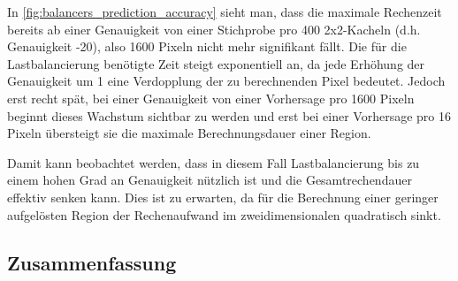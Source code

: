 In \autoref{fig:balancers_prediction_accuracy} sieht man, dass die maximale Rechenzeit bereits ab einer Genauigkeit von
einer Stichprobe pro 400 2x2-Kacheln (d.h. Genauigkeit -20), also 1600 Pixeln nicht mehr signifikant fällt.
Die für die Lastbalancierung benötigte Zeit steigt exponentiell an, da jede Erhöhung der Genauigkeit um 1 eine Verdopplung der zu berechnenden Pixel bedeutet.
Jedoch erst recht spät, bei einer Genauigkeit von einer Vorhersage pro 1600 Pixeln beginnt dieses Wachstum sichtbar zu werden
und erst bei einer Vorhersage pro 16 Pixeln übersteigt sie die maximale Berechnungsdauer einer Region.

Damit kann beobachtet werden, dass in diesem Fall Lastbalancierung bis zu einem hohen Grad an Genauigkeit nützlich ist
und die Gesamtrechendauer effektiv senken kann.
Dies ist zu erwarten, da für die Berechnung einer geringer aufgelösten Region
der Rechenaufwand im zweidimensionalen quadratisch sinkt.

%

\subsection{Zusammenfassung}
